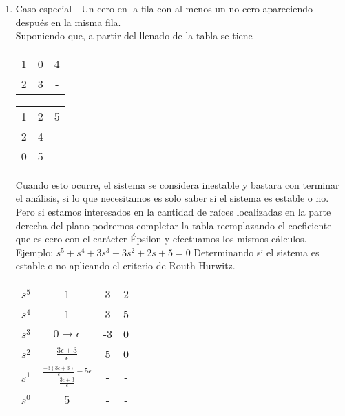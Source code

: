 \documentclass[
	12pt, %
]{fphw}
\begin{document}
\begin{enumerate}
\item Caso especial - Un cero en la fila con al menos un no cero apareciendo después en la misma fila. \\

  Suponiendo que, a partir del llenado de la tabla se tiene

  \begin{center}
\begin{tabular}{c c c}
1 & 0 & 4 \\
2 & 3 & - \\
\end{tabular}  
  \end{center}

  \begin{center}
\begin{tabular}{c c c}
1 & 2 & 5 \\
2 & 4 & - \\
0 & 5 & - \\
\end{tabular}  
\end{center}

  Cuando esto ocurre, el sistema se considera inestable y bastara con terminar el análisis, si lo que necesitamos es solo saber si el sistema es estable o no. Pero si estamos interesados en la cantidad de raíces localizadas en la parte derecha del plano podremos completar la tabla reemplazando el coeficiente que es cero con el carácter Épsilon y efectuamos los mismos cálculos.\\

  Ejemplo: $s^{5}+s^4+3s^3+3s^2+2s+5=0$ Determinando si el sistema es estable o no aplicando el criterio de Routh Hurwitz.\\

  \begin{center}
\begin{tabular}{c c c c}
$s^{5}$ & 1 & 3 & 2 \\
$s^{4}$ & 1 & 3 & 5 \\
$s^{3}$ & $0\rightarrow \epsilon$ & -3 & 0 \\
$s^{2}$ & $\frac{3\epsilon+3}{\epsilon}$ & 5 & 0 \\
  $s^{1}$ & $\frac{\frac{-3(3\epsilon+3)}{\epsilon}-5\epsilon}{\frac{3\epsilon+3}{\epsilon}}$ & - & - \\
  $s^{0}$ & 5 & - & - 
\end{tabular}  
\end{center}


\end{enumerate}
\end{document}
